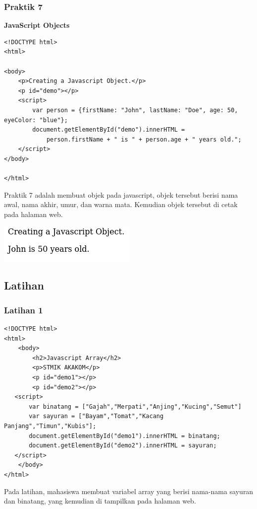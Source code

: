 \documentclass[a4paper,12pt]{article}
\begin{document}
\subsubsection{Praktik 7}
\textbf{JavaScript Objects\\}
\begin{lstlisting}
<!DOCTYPE html>
<html>

<body>
    <p>Creating a Javascript Object.</p>
    <p id="demo"></p>
    <script>
        var person = {firstName: "John", lastName: "Doe", age: 50, eyeColor: "blue"};
        document.getElementById("demo").innerHTML =
            person.firstName + " is " + person.age + " years old.";
    </script>
</body>

</html>
\end{lstlisting}

Praktik 7 adalah membuat objek pada javascript, objek tersebut berisi nama awal, nama akhir, umur, dan warna mata.
Kemudian objek tersebut di cetak pada halaman web.

\begin{center}
    \includegraphics[scale=.7]{7.png} 
\end{center}

\newpage

\subsection{Latihan}
\subsubsection{Latihan 1}
\begin{lstlisting}
<!DOCTYPE html>
<html>
    <body>
        <h2>Javascript Array</h2>
        <p>STMIK AKAKOM</p>
        <p id="demo1"></p>
        <p id="demo2"></p>
   <script>
       var binatang = ["Gajah","Merpati","Anjing","Kucing","Semut"]
       var sayuran = ["Bayam","Tomat","Kacang Panjang","Timun","Kubis"];
       document.getElementById("demo1").innerHTML = binatang;
       document.getElementById("demo2").innerHTML = sayuran;
   </script>
    </body>
</html>
\end{lstlisting}

Pada latihan, mahasiswa membuat variabel array yang berisi nama-nama sayuran dan binatang, yang kemudian di tampilkan
pada halaman web.
\end{document}
